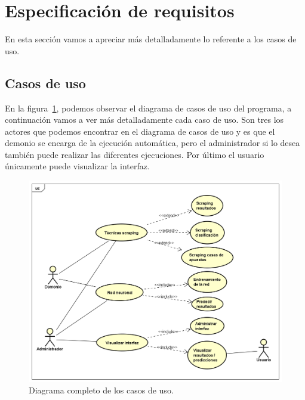 \section{Especificación de requisitos}
En esta sección vamos a apreciar más detalladamente lo referente a los casos de uso.

\subsection{Casos de uso}

En la figura~\ref{fig:DiagCasUso}, podemos observar el diagrama de casos de uso del programa, a continuación vamos a ver más detalladamente cada caso de uso. Son tres los actores que podemos encontrar en el diagrama de casos de uso y es que el demonio se encarga de la ejecución automática, pero el administrador si lo desea también puede realizar las diferentes ejecuciones. Por último el usuario únicamente puede visualizar la interfaz.

\begin{figure}
\centering
\includegraphics[width=.9\textwidth]{img/diagrama_casos_uso}
\caption{Diagrama completo de los casos de uso.}
\label{fig:DiagCasUso}
\end{figure}

